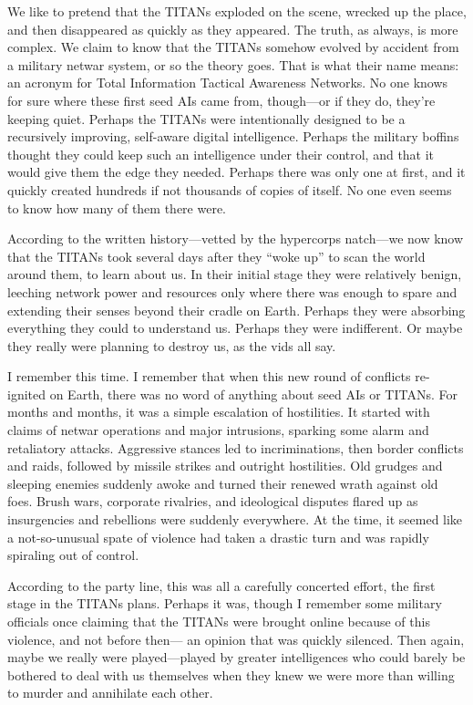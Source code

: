We like to pretend that the TITANs exploded on the scene, wrecked up the place, and then disappeared as quickly as they appeared. The truth, as always, is more complex. We claim to know that the TITANs somehow evolved by accident from a military netwar system, or so the theory goes. That is what their name means: an acronym for Total Information Tactical Awareness Networks. No one knows for sure where these first seed AIs came from, though—or if they do, they're keeping quiet. Perhaps the TITANs were intentionally designed to be a recursively improving, self-aware digital intelligence. Perhaps the military boffins thought they could keep such an intelligence under their control, and that it would give them the edge they needed. Perhaps there was only one at first, and it quickly created hundreds if not thousands of copies of itself. No one even seems to know how many of them there were. 

According to the written history—vetted by the hypercorps natch—we now know that the TITANs took several days after they “woke up” to scan the world around them, to learn about us. In their initial stage they were relatively benign, leeching network power and resources only where there was enough to spare and extending their senses beyond their cradle on Earth. Perhaps they were absorbing everything they could to understand us. Perhaps they were indifferent. Or maybe they really were planning to destroy us, as the vids all say. 

I remember this time. I remember that when this new round of conflicts re-ignited on Earth, there was no word of anything about seed AIs or TITANs. For months and months, it was a simple escalation of hostilities. It started with claims of netwar operations and major intrusions, sparking some alarm and retaliatory attacks. Aggressive stances led to incriminations, then border conflicts and raids, followed by missile strikes and outright hostilities. Old grudges and sleeping enemies suddenly awoke and turned their renewed wrath against old foes. Brush wars, corporate rivalries, and ideological disputes flared up as insurgencies and rebellions were suddenly everywhere. At the time, it seemed like a not-so-unusual spate of violence had taken a drastic turn and was rapidly spiraling out of control. 

According to the party line, this was all a carefully concerted effort, the first stage in the TITANs plans. Perhaps it was, though I remember some military officials once claiming that the TITANs were brought online because of this violence, and not before then— an opinion that was quickly silenced. Then again, maybe we really were played—played by greater intelligences who could barely be bothered to deal with us themselves when they knew we were more than willing to murder and annihilate each other. 

